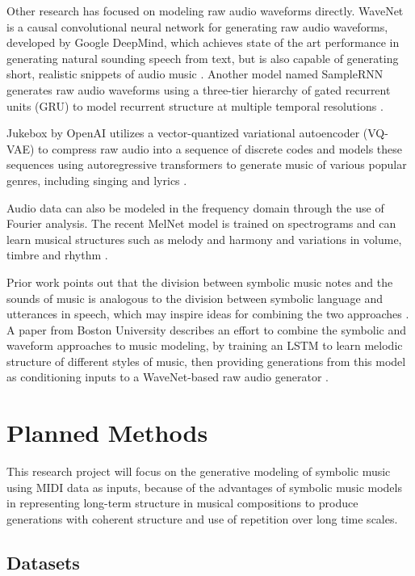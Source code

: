 \documentclass[sigconf,authorversion]{acmart}
\begin{document}
Other research has focused on modeling raw audio waveforms directly. WaveNet is
a causal convolutional neural network for generating raw audio waveforms,
developed by Google DeepMind, which achieves state of the art performance in
generating natural sounding speech from text, but is also capable of generating
short, realistic snippets of audio music \cite{oord_wavenet_2016}.
Another model named SampleRNN generates raw audio waveforms using a three-tier
hierarchy of gated recurrent units (GRU) to model recurrent structure at
multiple temporal resolutions \cite{mehri_samplernn_2017}.

Jukebox by OpenAI utilizes a vector-quantized variational autoencoder
(VQ-VAE) to compress raw audio into a sequence of discrete codes and
models these sequences using autoregressive transformers to generate
music of various popular genres, including singing and lyrics
\cite{dhariwal2020jukebox}.

Audio data can also be modeled in the frequency domain through the use of
Fourier analysis. The recent MelNet model is trained on spectrograms and can
learn musical structures such as melody and harmony and variations in volume,
timbre and rhythm \cite{vasquez2019melnet}.

Prior work points out that the division between symbolic music notes
and the sounds of music is analogous to the division between symbolic
language and utterances in speech, which may inspire ideas for
combining the two approaches \cite{hawthorne2019enabling}. A paper
from Boston University describes an effort to combine the symbolic and
waveform approaches to music modeling, by training an LSTM to learn
melodic structure of different styles of music, then providing
generations from this model as conditioning inputs to a WaveNet-based
raw audio generator \cite{manzelli_conditioning_2018}.

\section{Planned Methods}

This research project will focus on the generative modeling of
symbolic music using MIDI data as inputs, because of the advantages of
symbolic music models in representing long-term structure in musical
compositions to produce generations with coherent structure and use of
repetition over long time scales.

\subsection{Datasets}
\end{document}
